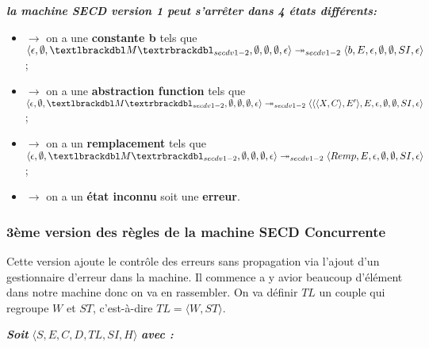 \documentclass[10pt,a4paper]{article}
\begin{document}
				
				\textbf{\textit{la machine SECD version 1 peut s'arrêter dans 4 états différents:}}
				\smallbreak
				\begin{itemize}
					\item[]$\longrightarrow$ on a une \textbf{constante b} tels que $\langle \epsilon,\emptyset,\textlbrackdbl M\textrbrackdbl_{secdv1-2},\emptyset,\emptyset,\emptyset,\epsilon\rangle \twoheadrightarrow_{secdv1-2} \langle b,E,\epsilon,\emptyset,\emptyset,SI,\epsilon\rangle$;
					\item[]$\longrightarrow$ on a une \textbf{abstraction function} tels que $\langle \epsilon,\emptyset,\textlbrackdbl M\textrbrackdbl_{secdv1-2},\emptyset,\emptyset,\emptyset,\epsilon\rangle \twoheadrightarrow_{secdv1-2} \langle\langle\langle X,C\rangle,E'\rangle,E,\epsilon,\emptyset,\emptyset,SI,\epsilon\rangle$;
					\item[]$\longrightarrow$ on a un \textbf{remplacement} tels que $\langle \epsilon,\emptyset,\textlbrackdbl M\textrbrackdbl_{secdv1-2},\emptyset,\emptyset,\emptyset,\epsilon\rangle \twoheadrightarrow_{secdv1-2} \langle Remp,E,\epsilon,\emptyset,\emptyset,SI,\epsilon\rangle$;
					\item[]$\longrightarrow$ on a un \textbf{état inconnu} soit une \textbf{erreur}.
				\end{itemize}
				\newpage
				
				
			\subsubsection{3ème version des règles de la machine SECD Concurrente}\label{SECDConc3}
				\smallbreak
				Cette version ajoute le contrôle des erreurs sans propagation via l'ajout d'un gestionnaire d'erreur dans la machine. Il commence a y avior beaucoup d'élément dans notre machine donc on va en rassembler. On va définir $TL$ un couple qui regroupe $W$ et $ST$, c'est-à-dire $TL = \langle W,ST\rangle$.
				\bigbreak
					
				\textbf{\textit{Soit}} $\langle S,E,C,D,TL,SI,H\rangle$ \textbf{\textit{avec :}}
			
\end{document}
